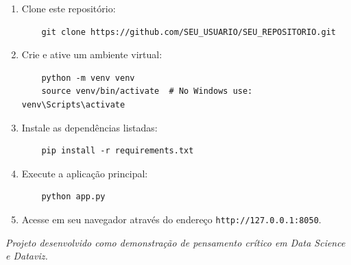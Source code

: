 \documentclass[12pt,a4paper]{article}
\begin{document}
\begin{enumerate}[label=\textbf{\arabic*.}]
    \item Clone este repositório:
    \begin{verbatim}
    git clone https://github.com/SEU_USUARIO/SEU_REPOSITORIO.git
    \end{verbatim}
    
    \item Crie e ative um ambiente virtual:
    \begin{verbatim}
    python -m venv venv
    source venv/bin/activate  # No Windows use: venv\Scripts\activate
    \end{verbatim}
    
    \item Instale as dependências listadas:
    \begin{verbatim}
    pip install -r requirements.txt
    \end{verbatim}
    
    \item Execute a aplicação principal:
    \begin{verbatim}
    python app.py
    \end{verbatim}
    
    \item Acesse em seu navegador através do endereço \texttt{http://127.0.0.1:8050}.
\end{enumerate}

\vspace{1cm}
\begin{center}
    \textit{Projeto desenvolvido como demonstração de pensamento crítico em Data Science e Dataviz.}
\end{center}
\end{document}
